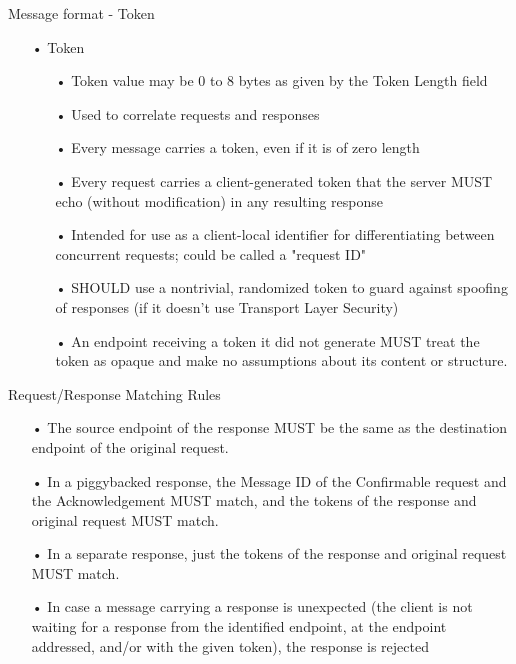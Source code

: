 \documentclass[11pt]{beamer}
\begin{document}
\begin{frame}{Message format - Token}
\begin{itemize}
\item[•] Token
\begin{itemize}
\item[•] Token value may be 0 to 8 bytes as given by the Token Length field
\item[•] Used to correlate requests and responses
\item[•] Every message carries a token, even if it is of zero length
\item[•] Every request carries a client-generated token that the server MUST echo (without modification) in any resulting response
\item[•] Intended for use as a client-local identifier for differentiating between concurrent requests; could be called a "request ID"
\item[•] SHOULD use a nontrivial, randomized token to guard against spoofing of responses (if it doesn't use Transport Layer Security)
\item[•] An endpoint receiving a token it did not generate MUST treat the token as opaque and make no assumptions about its content or structure.
\end{itemize}
\end{itemize}
\end{frame}
\begin{frame}{Request/Response Matching Rules}
\begin{itemize}
\item[•] The source endpoint of the response MUST be the same as the destination endpoint of the original request.
\item[•] In a piggybacked response, the Message ID of the Confirmable request and the Acknowledgement MUST match, and the tokens of the response and original request MUST match.  
\item[•] In a separate response, just the tokens of the response and original request MUST match.
\item[•] In case a message carrying a response is unexpected (the client is not waiting for a response from the identified endpoint, at the endpoint addressed, and/or with the given token), the response is rejected
\end{itemize}
\end{frame}
\end{document}
